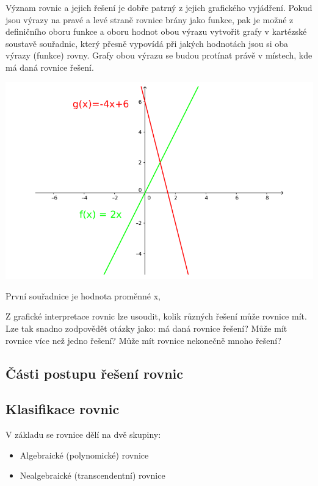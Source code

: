 \documentclass[11pt]{article}
\begin{document}
Význam rovnic a jejich řešení je dobře patrný z jejich grafického vyjádření. Pokud jsou výrazy na pravé a levé straně rovnice brány jako funkce, pak je možné z definičního oboru funkce a oboru hodnot obou výrazu vytvořit grafy v kartézské soustavě souřadnic, který přesně vypovídá při jakých hodnotách jsou si oba výrazy (funkce) rovny. Grafy obou výrazu se budou protínat právě v místech, kde má daná rovnice řešení. 

\vskip 4mm
\includegraphics[width=\linewidth]{Obrazky/GrafickeReseniRovnic.png}
\vskip 4mm

První souřadnice je hodnota proměnné x,

Z grafické interpretace rovnic lze usoudit, kolik různých řešení může rovnice mít. Lze tak snadno zodpovědět otázky jako: má daná rovnice řešení? Může mít rovnice více než jedno řešení? Může mít rovnice nekonečně mnoho řešení? 

\subsection{Části postupu řešení rovnic}

\subsection{Klasifikace rovnic}

V základu se rovnice dělí na dvě skupiny:

\begin{itemize}
\item Algebraické (polynomické) rovnice
\item Nealgebraické (transcendentní) rovnice
\end{itemize}
\end{document}
